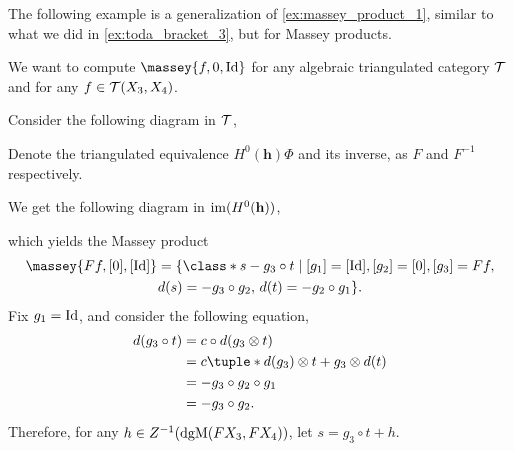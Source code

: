 The following example is a generalization of \autoref{ex:massey_product_1}, similar to what we did in \autoref{ex:toda_bracket_3}, but for Massey products.

\begin{example}
    We want to compute \( \massey{f, 0, \Id} \) for any algebraic triangulated category \( {\mathcal{T}} \) and for any \( f \in {\mathcal{T}}(X_3, X_4) \).

    Consider the following diagram in \( {\mathcal{T}} \),
    \begin{center}
    \end{center}

    Denote the triangulated equivalence \( H^0(\mathbf{h}) \Phi \) and its inverse, as \( F \) and \( F^{-1} \) respectively.

    We get the following diagram in \( \operatorname{im}(H^0(\mathbf{h})) \),
    \begin{center}
    \end{center}
    which yields the Massey product
    \begin{multline*}
        \massey{F f, [0], [\Id]} =
        \{
            \class*{
                s - g_3 \circ t
            }
            \mid [g_1] = [\Id], [g_2] = [0], [g_3] = F f, \\
            d(s) = - g_3 \circ g_2, \,
            d(t) = - g_2 \circ g_1
        \}.
    \end{multline*}
    Fix \( g_1 = \operatorname{Id} \), and consider the following equation,
    \begin{align*}
        d(g_3 \circ t) &= c \circ d (g_3 \otimes t) \\
        &= c \tuple*{ d(g_3) \otimes t + g_3 \otimes d(t) } \\
        &= - g_3 \circ g_2 \circ g_1 \\
        &= - g_3 \circ g_2.
    \end{align*}
    Therefore, for any \( h \in Z^{-1}(\operatorname{dgM}(F X_3, F X_4)) \), let \( s = g_3 \circ t + h \).


\end{example}
